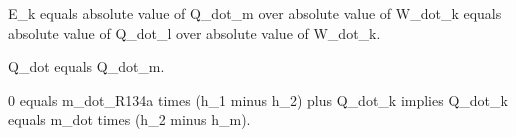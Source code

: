E_k equals absolute value of Q_dot_m over absolute value of W_dot_k equals absolute value of Q_dot_l over absolute value of W_dot_k.

Q_dot equals Q_dot_m.

0 equals m_dot_R134a times (h_1 minus h_2) plus Q_dot_k implies Q_dot_k equals m_dot times (h_2 minus h_m).